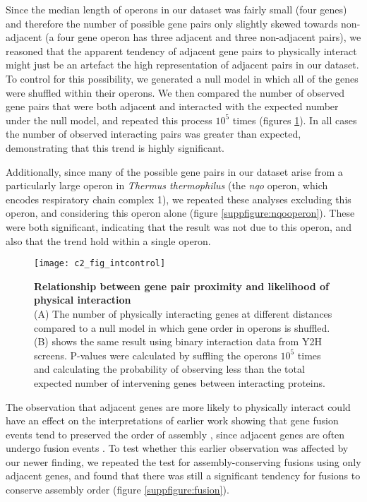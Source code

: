 \documentclass[a4paper,11pt,twoside,openright]{scrbook}
\begin{document}
Since the median length of operons in our dataset was fairly small (four genes) and therefore the number of possible gene pairs only slightly skewed towards non-adjacent (a four gene operon has three adjacent and three non-adjacent pairs), we reasoned that the apparent tendency of adjacent gene pairs to physically interact might just be an artefact the high representation of adjacent pairs in our dataset. To control for this possibility, we generated a null model in which all of the genes were shuffled within their operons. We then compared the number of observed gene pairs that were both adjacent and interacted with the expected number under the null model, and repeated this process \(10^{5}\) times (figures \ref{figure:interveningcontrol}). In all cases the number of observed interacting pairs was greater than expected, demonstrating that this trend is highly significant.

Additionally, since many of the possible gene pairs in our dataset arise from a particularly large operon in \textit{Thermus thermophilus} (the \textit{nqo} operon, which encodes respiratory chain complex 1), we repeated these analyses excluding this operon, and considering this operon alone (figure \ref{suppfigure:nqooperon}). These were both significant, indicating that the result was not due to this operon, and also that the trend hold within a single operon.

\begin{figure}[h]
    \texttt{[image: c2\_fig\_intcontrol]}
    \caption[Relationship between gene pair proximity and likelihood of physical interaction]{\sffamily \textbf{Relationship between gene pair proximity and likelihood of physical interaction} \\ \small (A) The number of physically interacting genes at different distances compared to a null model in which gene order in operons is shuffled. (B) shows the same result using binary interaction data from Y2H screens\cite{Rajagopala2014}. P-values were calculated by suffling the operons $10^{5}$ times and calculating the probability of observing less than the total expected number of intervening genes between interacting proteins.}
    \label{figure:interveningcontrol}
\end{figure}

The observation that adjacent genes are more likely to physically interact could have an effect on the interpretations of earlier work showing that gene fusion events tend to preserved the order of assembly \cite{Marsh2013}, since adjacent genes are often undergo fusion events \cite{Pasek2006}. To test whether this earlier observation was affected by our newer finding, we repeated the test for assembly-conserving fusions using only adjacent genes, and found that there was still a significant tendency for fusions to conserve assembly order (figure \ref{suppfigure:fusion}).
\end{document}
